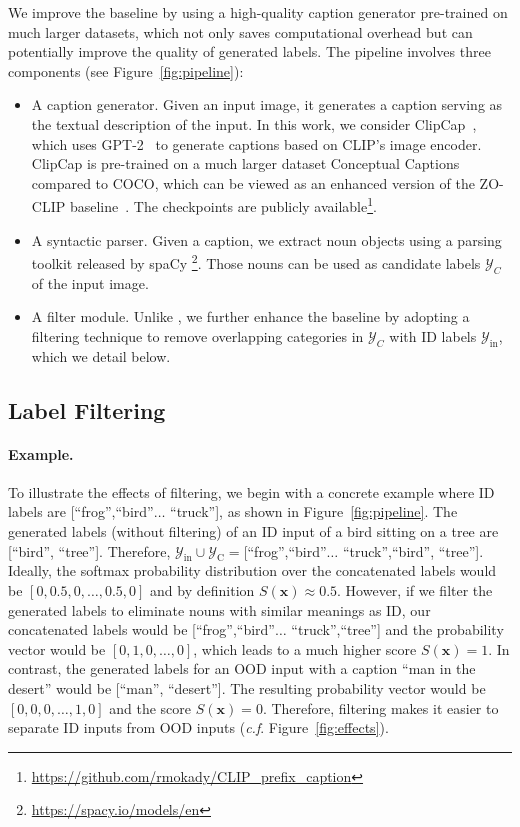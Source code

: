 \documentclass{article}
\def\*#1{\mathbf{#1}}
\def\cf{\emph{c.f}. }
\begin{document}
We improve the baseline by using a high-quality caption generator pre-trained on much larger datasets, which not only saves computational overhead but can potentially improve the quality of generated labels.  The pipeline involves three components (see Figure~\ref{fig:pipeline}):
\begin{itemize}
    \item A caption generator. Given an input image, it generates a caption serving as the textual description of the input.  In this work, we consider ClipCap~\cite{mokady2021ClipCap}, which uses GPT-2~\cite{radford2019language} to generate captions based on CLIP's image encoder. ClipCap is pre-trained on a much larger dataset Conceptual Captions~\cite{ng2020understanding} compared to COCO, which can be viewed as an enhanced version of the ZO-CLIP baseline~\cite{esmaeilpour2022zero}. The checkpoints are publicly available\footnote{\url{https://github.com/rmokady/CLIP_prefix_caption}}. 
    \item  A syntactic parser. Given a caption, we extract noun objects using a parsing toolkit released by spaCy \footnote{\url{https://spacy.io/models/en}}. Those nouns can be used as candidate labels $\mathcal{Y}_C$ of the input image.
    \item A filter module. Unlike \cite{esmaeilpour2022zero}, we further enhance the baseline by adopting a filtering technique to remove overlapping categories in $\mathcal{Y}_C$ with ID labels $\mathcal{Y}_{\text{in}}$, which we detail below.
\end{itemize}

\subsection{Label Filtering}
\label{sec:example}
\paragraph{Example.} To illustrate the effects of filtering, we begin with a concrete example where ID labels are [``frog'',``bird''$\ldots$ ``truck''], as shown in Figure~\ref{fig:pipeline}. The generated labels (without filtering) of an ID input of a bird sitting on a tree are [``bird'', ``tree'']. Therefore, $\mathcal{Y}_\text{in}\cup\mathcal{Y}_\text{C}=$[``frog'',``bird''$\ldots$ ``truck'',``bird'', ``tree'']. 
 Ideally, the softmax probability distribution over the concatenated labels would be $[0, 0.5, 0, \ldots, 0.5, 0]$ and by definition $S(\*x) \approx 0.5$. However, if we filter the generated labels to eliminate nouns with similar meanings as ID, our concatenated labels would be [``frog'',``bird''$\ldots$ ``truck'',``tree''] and the probability vector would be $[0,1,0, \ldots, 0]$, which leads to a much higher score $S(\*x) = 1$. In contrast, the generated labels for an OOD input with a caption ``man in the desert'' would be [``man'', ``desert'']. The resulting probability vector would be $[0,0,0, \ldots,1, 0]$  and the score $S(\*x) = 0$. Therefore, filtering makes it easier to separate ID inputs from OOD inputs (\cf Figure~\ref{fig:effects}). 
\end{document}
